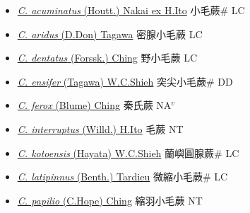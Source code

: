 \begin{itemize}
  \begin{itemize}
        \item[] \href{http://www.theplantlist.org/tpl1.1/search?q=Cyclosorus+acuminatus}{\textit{C. acuminatus} (Houtt.) Nakai ex H.Ito}   小毛蕨\# LC
        \item[] \href{http://www.theplantlist.org/tpl1.1/search?q=Cyclosorus+aridus}{\textit{C. aridus} (D.Don) Tagawa}   密腺小毛蕨 LC
        \item[] \href{http://www.theplantlist.org/tpl1.1/search?q=Cyclosorus+dentatus}{\textit{C. dentatus} (Forssk.) Ching}   野小毛蕨 LC
        \item[] \href{http://www.theplantlist.org/tpl1.1/search?q=Cyclosorus+ensifer}{\textit{C. ensifer} (Tagawa) W.C.Shieh}     突尖小毛蕨\# DD
        \item[] \href{http://www.theplantlist.org/tpl1.1/search?q=Cyclosorus+ferox}{\textit{C. ferox} (Blume) Ching}   秦氏蕨 NA$^v$
        \item[] \href{http://www.theplantlist.org/tpl1.1/search?q=Cyclosorus+interruptus}{\textit{C. interruptus} (Willd.) H.Ito}   毛蕨 NT
        \item[] \href{http://www.theplantlist.org/tpl1.1/search?q=Cyclosorus+kotoensis}{\textit{C. kotoensis} (Hayata) W.C.Shieh}   蘭嶼圓腺蕨\# LC
        \item[] \href{http://www.theplantlist.org/tpl1.1/search?q=Cyclosorus+latipinnus}{\textit{C. latipinnus} (Benth.) Tardieu}   微縮小毛蕨\# LC
        \item[] \href{http://www.theplantlist.org/tpl1.1/search?q=Cyclosorus+papilio}{\textit{C. papilio} (C.Hope) Ching}   縮羽小毛蕨 NT

\end{itemize}
\end{itemize}
